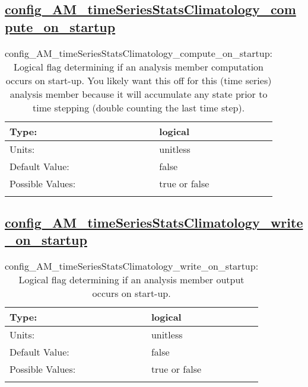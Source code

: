 \subsection[config\_AM\_timeSeriesStatsClimatology\_compute\_on\_startup]{\hyperref[sec:nm_tab_AM_timeSeriesStatsClimatology]{config\_AM\_timeSeriesStatsClimatology\_compute\_on\_startup}}
\label{subsec:nm_sec_config_AM_timeSeriesStatsClimatology_compute_on_startup}
\begin{center}
\begin{longtable}{| p{2.0in} || p{4.0in} |}
    \hline
    Type: & logical \\
    \hline
    Units: & \si{unitless} \\
    \hline
    Default Value: & false \\
    \hline
    Possible Values: & true or false \\
    \hline
    \caption{config\_AM\_timeSeriesStatsClimatology\_compute\_on\_startup: Logical flag determining if an analysis member computation occurs on start-up. You likely want this off for this (time series) analysis member because it will accumulate any state prior to time stepping (double counting the last time step).}
\end{longtable}
\end{center}
\subsection[config\_AM\_timeSeriesStatsClimatology\_write\_on\_startup]{\hyperref[sec:nm_tab_AM_timeSeriesStatsClimatology]{config\_AM\_timeSeriesStatsClimatology\_write\_on\_startup}}
\label{subsec:nm_sec_config_AM_timeSeriesStatsClimatology_write_on_startup}
\begin{center}
\begin{longtable}{| p{2.0in} || p{4.0in} |}
    \hline
    Type: & logical \\
    \hline
    Units: & \si{unitless} \\
    \hline
    Default Value: & false \\
    \hline
    Possible Values: & true or false \\
    \hline
    \caption{config\_AM\_timeSeriesStatsClimatology\_write\_on\_startup: Logical flag determining if an analysis member output occurs on start-up.}
\end{longtable}
\end{center}
